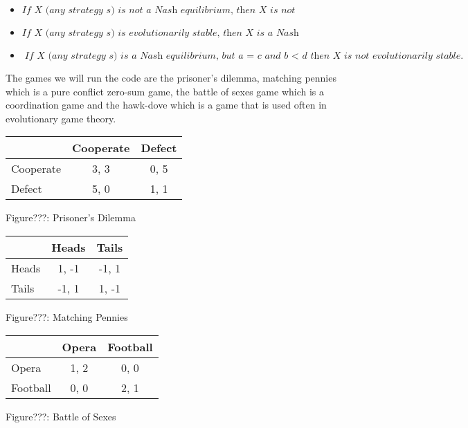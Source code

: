 \documentclass{article}
\begin{document}
\begin{itemize}
\item $\textit{If X (any strategy s) is not a Nash equilibrium, then X is not evolutionarily stable.}$ 
\item $\textit{If X (any strategy s) is evolutionarily stable, then X is a Nash equilibrium.}$ 
\item $\textit{If X (any strategy s) is a Nash equilibrium, but  $\textit{a = c and b $<$ d}$ then X is not evolutionarily stable.}$
\end{itemize}

The games we will run the code are the prisoner's dilemma, matching pennies which is a pure conflict zero-sum game, the battle of sexes game which is a coordination game and the hawk-dove which is a game that is used often in evolutionary game theory.

\begin{center}
\begin{tabular}{|l|c|c|}
\hline
 & Cooperate & Defect \\ 
\hline
Cooperate & 3, 3 & 0, 5\\
\hline
 Defect & 5, 0 & 1, 1\\
\hline
\end{tabular}
\end{center}
\begin{center}
	Figure???: Prisoner's Dilemma
\end{center}

\begin{center}
\begin{tabular}{|l|c|c|}
\hline
 & Heads & Tails \\ 
\hline
Heads & 1, -1 & -1, 1\\
\hline
 Tails & -1, 1 & 1, -1\\
\hline
\end{tabular}
\end{center}
\begin{center}
	Figure???: Matching Pennies
\end{center}

\begin{center}
\begin{tabular}{|l|c|c|}
\hline
 & Opera & Football \\ 
\hline
Opera & 1, 2 & 0, 0\\
\hline
 Football & 0, 0 & 2, 1\\
\hline
\end{tabular}
\end{center}
\begin{center}
	Figure???: Battle of Sexes
\end{center}
\end{document}
